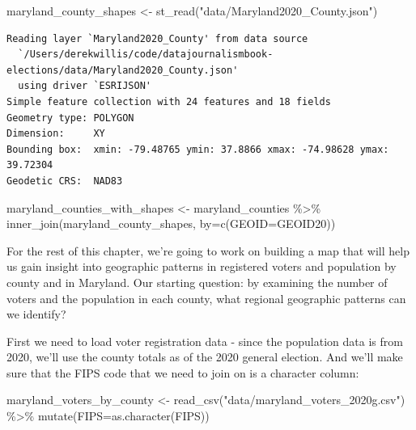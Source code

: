 \documentclass[
  letterpaper,
  DIV=11,
  numbers=noendperiod]{scrreprt}
\newenvironment{Shaded}{\begin{snugshade}}{\end{snugshade}}
\newcommand{\AttributeTok}[1]{\textcolor[rgb]{0.40,0.45,0.13}{#1}}
\newcommand{\FunctionTok}[1]{\textcolor[rgb]{0.28,0.35,0.67}{#1}}
\newcommand{\NormalTok}[1]{\textcolor[rgb]{0.00,0.23,0.31}{#1}}
\newcommand{\OtherTok}[1]{\textcolor[rgb]{0.00,0.23,0.31}{#1}}
\newcommand{\SpecialCharTok}[1]{\textcolor[rgb]{0.37,0.37,0.37}{#1}}
\newcommand{\StringTok}[1]{\textcolor[rgb]{0.13,0.47,0.30}{#1}}
\begin{document}
\begin{Shaded}
\begin{Highlighting}[]
\NormalTok{maryland\_county\_shapes }\OtherTok{\textless{}{-}} \FunctionTok{st\_read}\NormalTok{(}\StringTok{"data/Maryland2020\_County.json"}\NormalTok{)}
\end{Highlighting}
\end{Shaded}

\begin{verbatim}
Reading layer `Maryland2020_County' from data source 
  `/Users/derekwillis/code/datajournalismbook-elections/data/Maryland2020_County.json' 
  using driver `ESRIJSON'
Simple feature collection with 24 features and 18 fields
Geometry type: POLYGON
Dimension:     XY
Bounding box:  xmin: -79.48765 ymin: 37.8866 xmax: -74.98628 ymax: 39.72304
Geodetic CRS:  NAD83
\end{verbatim}

\begin{Shaded}
\begin{Highlighting}[]
\NormalTok{maryland\_counties\_with\_shapes }\OtherTok{\textless{}{-}}\NormalTok{ maryland\_counties }\SpecialCharTok{\%\textgreater{}\%} \FunctionTok{inner\_join}\NormalTok{(maryland\_county\_shapes, }\AttributeTok{by=}\FunctionTok{c}\NormalTok{(}\StringTok{\textquotesingle{}GEOID\textquotesingle{}}\OtherTok{=}\StringTok{\textquotesingle{}GEOID20\textquotesingle{}}\NormalTok{))}
\end{Highlighting}
\end{Shaded}

For the rest of this chapter, we're going to work on building a map that
will help us gain insight into geographic patterns in registered voters
and population by county and in Maryland. Our starting question: by
examining the number of voters and the population in each county, what
regional geographic patterns can we identify?

First we need to load voter registration data - since the population
data is from 2020, we'll use the county totals as of the 2020 general
election. And we'll make sure that the FIPS code that we need to join on
is a character column:

\begin{Shaded}
\begin{Highlighting}[]
\NormalTok{maryland\_voters\_by\_county }\OtherTok{\textless{}{-}} \FunctionTok{read\_csv}\NormalTok{(}\StringTok{"data/maryland\_voters\_2020g.csv"}\NormalTok{) }\SpecialCharTok{\%\textgreater{}\%} \FunctionTok{mutate}\NormalTok{(}\AttributeTok{FIPS=}\FunctionTok{as.character}\NormalTok{(FIPS))}
\end{Highlighting}
\end{Shaded}
\end{document}
